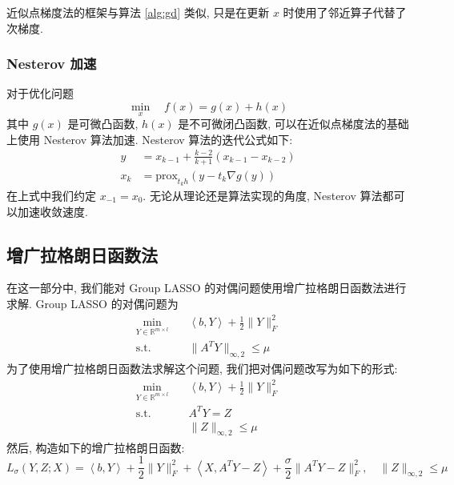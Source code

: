 \documentclass{article}
\begin{document}
近似点梯度法的框架与算法 \ref{alg:gd} 类似, 只是在更新 $x$ 时使用了邻近算子代替了次梯度.

\subsubsection{Nesterov 加速}
对于优化问题
\begin{equation*}
    \min_x\quad f(x)=g(x)+h(x)
\end{equation*}
其中 $g(x)$ 是可微凸函数, $h(x)$ 是不可微闭凸函数, 可以在近似点梯度法的基础上使用 Nesterov 算法加速. Nesterov 算法的迭代公式如下:
\begin{equation*}
    \begin{aligned}
        y &= x_{k-1} + \frac{k-2}{k+1}(x_{k-1} - x_{k-2})\\
        x_k &= \text{prox}_{t_k h}(y - t_k \nabla g(y))
    \end{aligned}
\end{equation*}
在上式中我们约定 $x_{-1} = x_0$. 无论从理论还是算法实现的角度, Nesterov 算法都可以加速收敛速度.

\subsection{增广拉格朗日函数法}

在这一部分中, 我们能对 Group LASSO 的对偶问题使用增广拉格朗日函数法进行求解. Group LASSO 的对偶问题为
\begin{equation*}
    \begin{aligned}
        \min_{Y\in \mathbb{R}^{m\times l}}\quad &\left<b, Y\right> + \frac{1}{2} \|Y\|_F^2
        \\
        \text{s.t.}\quad & \|A^T Y\|_{\infty,2} \leq \mu
    \end{aligned}
\end{equation*}
为了使用增广拉格朗日函数法求解这个问题, 我们把对偶问题改写为如下的形式:
\begin{equation}
    \begin{aligned}
        \min_{Y\in \mathbb{R}^{m\times l}}\quad &\left<b, Y\right> + \frac{1}{2} \|Y\|_F^2
        \\
        \text{s.t.}\quad & A^T Y = Z\\
        & \|Z\|_{\infty,2} \leq \mu
    \end{aligned}
    \label{eq:dual}
\end{equation}
然后, 构造如下的增广拉格朗日函数:
\begin{equation*}
    L_\sigma(Y,Z;X) = \left<b, Y\right> + \frac{1}{2} \|Y\|_F^2 + \left<X, A^T Y - Z\right> + \frac{\sigma}{2} \|A^T Y - Z\|_F^2,\quad \|Z\|_{\infty,2} \leq \mu
\end{equation*}
\end{document}
